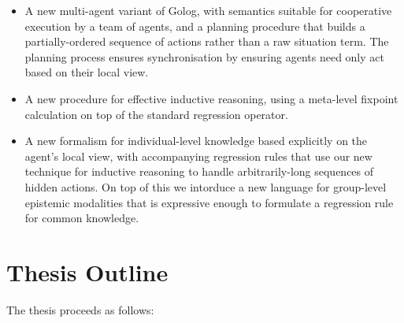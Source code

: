 \begin{itemize}
\item A new multi-agent variant of Golog, with semantics suitable for cooperative
execution by a team of agents, and a planning procedure that builds
a partially-ordered sequence of actions rather than a raw situation
term. The planning process ensures synchronisation by ensuring agents
need only act based on their local view.
\item A new procedure for effective inductive reasoning, using a meta-level
fixpoint calculation on top of the standard regression operator. 
\item A new formalism for individual-level knowledge based explicitly on
the agent's local view, with accompanying regression rules that use
our new technique for inductive reasoning to handle arbitrarily-long
sequences of hidden actions. On top of this we intorduce a new language
for group-level epistemic modalities that is expressive enough to
formulate a regression rule for common knowledge.
\end{itemize}

\section{Thesis Outline}

The thesis proceeds as follows:


